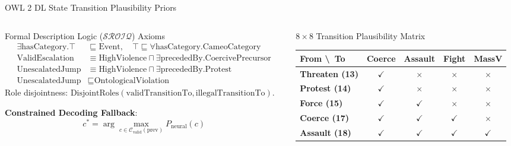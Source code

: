 \documentclass[aspectratio=169, 10pt]{beamer}
\begin{document}
\begin{frame}{OWL 2 DL State Transition Plausibility Priors}
  \begin{columns}[T]
    \begin{column}{0.52\textwidth}
      \begin{block}{Formal Description Logic ($\mathcal{SROIQ}$) Axioms}
        \small
        \begin{align*}
          \exists \text{hasCategory}.\top &\sqsubseteq \text{Event}, \quad \top \sqsubseteq \forall \text{hasCategory}.\text{CameoCategory} \\
          \text{ValidEscalation} &\equiv \text{HighViolence} \sqcap \exists \text{precededBy}.\text{CoercivePrecursor} \\
          \text{UnescalatedJump} &\equiv \text{HighViolence} \sqcap \exists \text{precededBy}.\text{Protest} \\
          \text{UnescalatedJump} &\sqsubseteq \text{OntologicalViolation}
        \end{align*}
        Role disjointness: $\text{DisjointRoles}(\text{validTransitionTo}, \text{illegalTransitionTo})$.
      \end{block}
      \vspace{0.4em}
      \textbf{Constrained Decoding Fallback}:
      $$c^* = \arg\max_{c \in \mathcal{C}_{\text{valid}}(\text{prev})} P_{\text{neural}}(c)$$
    \end{column}
    \begin{column}{0.44\textwidth}
      \begin{block}{$8 \times 8$ Transition Plausibility Matrix}
        \centering
        \scriptsize
        \begin{tabular}{lcccc}
          \toprule
          \textbf{From \textbackslash\ To} & \textbf{Coerce} & \textbf{Assault} & \textbf{Fight} & \textbf{MassV} \\
          \midrule
          \textbf{Threaten (13)} & $\checkmark$ & $\times$ & $\times$ & $\times$ \\
          \textbf{Protest (14)}  & $\checkmark$ & $\times$ & $\times$ & $\times$ \\
          \textbf{Force (15)}    & $\checkmark$ & $\checkmark$ & $\times$ & $\times$ \\
          \textbf{Coerce (17)}   & $\checkmark$ & $\checkmark$ & $\checkmark$ & $\times$ \\
          \textbf{Assault (18)}  & $\checkmark$ & $\checkmark$ & $\checkmark$ & $\checkmark$ \\

\end{tabular}
\end{block}
\end{column}
\end{columns}
\end{frame}
\end{document}
